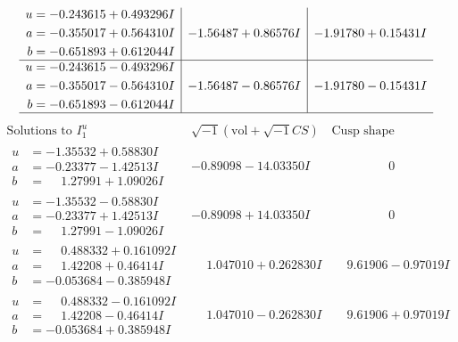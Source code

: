 \documentclass[1p]{elsarticle_modified}
\theoremstyle{definition}
\newcommand{\I}{\sqrt{-1}}
\begin{document}
$$\begin{array}{c|c|c}
\begin{aligned}
u &= -0.243615 + 0.493296 I \\
a &= -0.355017 + 0.564310 I \\
b &= -0.651893 + 0.612044 I\end{aligned}
 & -1.56487 + 0.86576 I & -1.91780 + 0.15431 I \\ \hline\begin{aligned}
u &= -0.243615 - 0.493296 I \\
a &= -0.355017 - 0.564310 I \\
b &= -0.651893 - 0.612044 I\end{aligned}
 & -1.56487 - 0.86576 I & -1.91780 - 0.15431 I\\
 \hline 
 \end{array}$$\newpage$$\begin{array}{c|c|c}  
\text{Solutions to }I^u_{1}& \I (\text{vol} + \sqrt{-1}CS) & \text{Cusp shape}\\
 \hline 
\begin{aligned}
u &= -1.35532 + 0.58830 I \\
a &= -0.23377 - 1.42513 I \\
b &= \phantom{-}1.27991 + 1.09026 I\end{aligned}
 & -0.89098 - 14.03350 I & \phantom{-0.000000 } 0 \\ \hline\begin{aligned}
u &= -1.35532 - 0.58830 I \\
a &= -0.23377 + 1.42513 I \\
b &= \phantom{-}1.27991 - 1.09026 I\end{aligned}
 & -0.89098 + 14.03350 I & \phantom{-0.000000 } 0 \\ \hline\begin{aligned}
u &= \phantom{-}0.488332 + 0.161092 I \\
a &= \phantom{-}1.42208 + 0.46414 I \\
b &= -0.053684 - 0.385948 I\end{aligned}
 & \phantom{-}1.047010 + 0.262830 I & \phantom{-}9.61906 - 0.97019 I \\ \hline\begin{aligned}
u &= \phantom{-}0.488332 - 0.161092 I \\
a &= \phantom{-}1.42208 - 0.46414 I \\
b &= -0.053684 + 0.385948 I\end{aligned}
 & \phantom{-}1.047010 - 0.262830 I & \phantom{-}9.61906 + 0.97019 I \\ \hline\begin{aligned}

\end{aligned}
\end{array}$$
\end{document}
